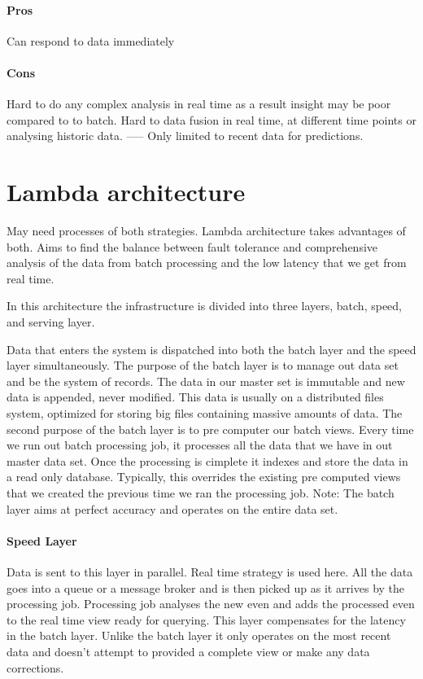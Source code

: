 \documentclass[a4paper, 11pt]{book}
\begin{document}
    \paragraph{Pros}
    Can respond to data immediately

    \paragraph{Cons}
    Hard to do any complex analysis in real time as a result insight may be poor compared to to batch.
    Hard to data fusion in real time, at different time points or analysing historic data.
    ----- Only limited to recent data for predictions.

    \section{Lambda architecture}
    May need processes of both strategies.
    Lambda architecture takes advantages of both.
    Aims to find the balance between fault tolerance and comprehensive analysis of the data from batch processing and the low latency that we get from real time.

    In this architecture the infrastructure is divided into three layers, batch, speed, and serving layer.

    Data that enters the system is dispatched into both the batch layer and the speed layer simultaneously.
    The purpose of the batch layer is to manage out data set and be the system of records.
    The data in our master set is immutable and new data is appended, never modified.
    This data is usually on a distributed files system, optimized for storing big files containing massive amounts of data.
    The second purpose of the batch layer is to pre computer our batch views.
    Every time we run out batch processing job, it processes all the data that we have in out master data set.
    Once the processing is cimplete it indexes and store the data in a read only database.
    Typically, this overrides the existing pre computed views that we created the previous time we ran the processing job.
    Note: The batch layer aims at perfect accuracy and operates on the entire data set.

    \paragraph{Speed Layer}
    Data is sent to this layer in parallel.
    Real time strategy is used here.
    All the data goes into a queue or a message broker and is then picked up as it arrives by the processing job.
    Processing job analyses the new even and adds the processed even to the real time view ready for querying.
    This layer compensates for the latency in the batch layer.
    Unlike the batch layer it only operates on the most recent data and doesn't attempt to provided a complete view or make any data corrections.
\end{document}
